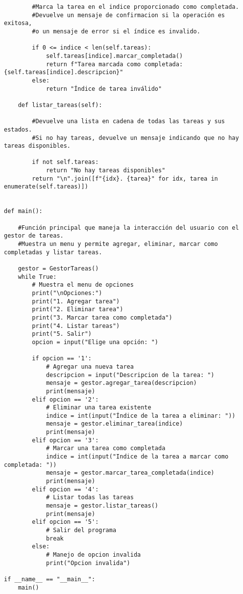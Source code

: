 \documentclass[10pt,a4paper]{article}
\begin{document}
\begin{lstlisting}
        #Marca la tarea en el indice proporcionado como completada.
        #Devuelve un mensaje de confirmacion si la operación es exitosa,
        #o un mensaje de error si el índice es invalido.
        
        if 0 <= indice < len(self.tareas):
            self.tareas[indice].marcar_completada()
            return f"Tarea marcada como completada: {self.tareas[indice].descripcion}"
        else:
            return "Índice de tarea inválido"

    def listar_tareas(self):
        
        #Devuelve una lista en cadena de todas las tareas y sus estados.
        #Si no hay tareas, devuelve un mensaje indicando que no hay tareas disponibles.
        
        if not self.tareas:
            return "No hay tareas disponibles"
        return "\n".join([f"{idx}. {tarea}" for idx, tarea in enumerate(self.tareas)])


def main():
    
    #Función principal que maneja la interacción del usuario con el gestor de tareas.
    #Muestra un menu y permite agregar, eliminar, marcar como completadas y listar tareas.
    
    gestor = GestorTareas()
    while True:
        # Muestra el menu de opciones
        print("\nOpciones:")
        print("1. Agregar tarea")
        print("2. Eliminar tarea")
        print("3. Marcar tarea como completada")
        print("4. Listar tareas")
        print("5. Salir")
        opcion = input("Elige una opción: ")

        if opcion == '1':
            # Agregar una nueva tarea
            descripcion = input("Descripcion de la tarea: ")
            mensaje = gestor.agregar_tarea(descripcion)
            print(mensaje)
        elif opcion == '2':
            # Eliminar una tarea existente
            indice = int(input("Índice de la tarea a eliminar: "))
            mensaje = gestor.eliminar_tarea(indice)
            print(mensaje)
        elif opcion == '3':
            # Marcar una tarea como completada
            indice = int(input("Indice de la tarea a marcar como completada: "))
            mensaje = gestor.marcar_tarea_completada(indice)
            print(mensaje)
        elif opcion == '4':
            # Listar todas las tareas
            mensaje = gestor.listar_tareas()
            print(mensaje)
        elif opcion == '5':
            # Salir del programa
            break
        else:
            # Manejo de opcion invalida
            print("Opcion invalida")

if __name__ == "__main__":
    main()

\end{lstlisting}
\newpage
\end{document}
